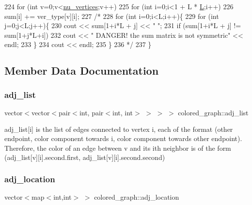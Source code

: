 \begin{DoxyCode}
224   \textcolor{keywordflow}{for} (\textcolor{keywordtype}{int} v=0;v<\hyperlink{classcolored__graph_a90ece8eb1fec52f3f41549ab527c1d5b}{nu\_vertices};v++)
225     \textcolor{keywordflow}{for} (\textcolor{keywordtype}{int} i=0;i<1 + L * \hyperlink{classcolored__graph_ae159d1b15106b70a2eabef8884501e97}{L};i++)
226       sum[i] += ver\_type[v][i];
227   \textcolor{comment}{/*}
228 \textcolor{comment}{  for (int i=0;i<L;i++)\{}
229 \textcolor{comment}{    for (int j=0;j<L;j++)\{}
230 \textcolor{comment}{      cout << sum[1+i*L + j] << " ";}
231 \textcolor{comment}{      if (sum[1+i*L + j] != sum[1+j*L+i])}
232 \textcolor{comment}{        cout << " DANGER! the sum matrix is not symmetric" << endl;}
233 \textcolor{comment}{    \}}
234 \textcolor{comment}{    cout << endl;}
235 \textcolor{comment}{  \}}
236 \textcolor{comment}{  */}
237 \}
\end{DoxyCode}


\subsection{Member Data Documentation}
\mbox{\label{classcolored__graph_a45dce16965079286cf3f41a54a1b2ea4}} 
\subsubsection{\texorpdfstring{adj\+\_\+list}{adj\_list}}
{\footnotesize\ttfamily vector$<$vector$<$pair$<$int, pair$<$int, int$>$ $>$ $>$ $>$ colored\+\_\+graph\+::adj\+\_\+list}



adj\+\_\+list\mbox{[}i\mbox{]} is the list of edges connected to vertex i, each of the format (other endpoint, color component towards i, color component towards other endpoint). Therefore, the color of an edge between v and its ith neighbor is of the form (adj\+\_\+list\mbox{[}v\mbox{]}\mbox{[}i\mbox{]}.second.\+first, adj\+\_\+list\mbox{[}v\mbox{]}\mbox{[}i\mbox{]}.second.\+second) 

\mbox{\label{classcolored__graph_ad657e7e86bee874d19dbc1765e1edaa7}} 
\subsubsection{\texorpdfstring{adj\+\_\+location}{adj\_location}}
{\footnotesize\ttfamily vector$<$map$<$int,int$>$ $>$ colored\+\_\+graph\+::adj\+\_\+location}



